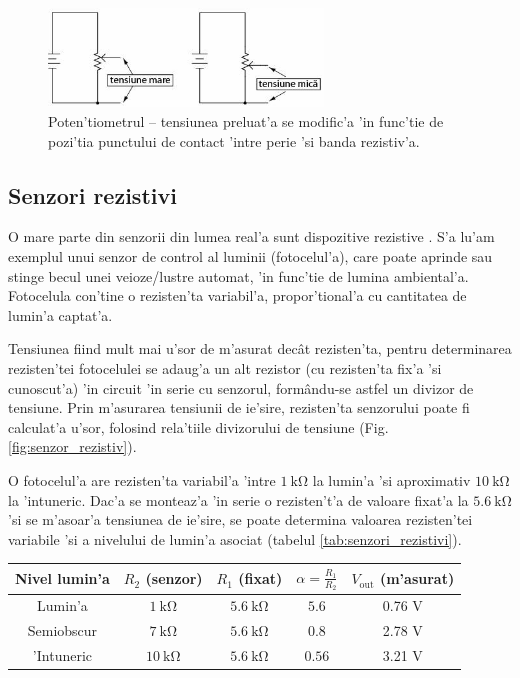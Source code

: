\begin{figure}[!t]
	\centering
		\includegraphics[width=0.65\textwidth]{laborator_01/figuri/6_potentiometru2}
	\caption{Poten'tiometrul -- tensiunea preluat'a se modific'a 'in func'tie de pozi'tia punctului de contact 'intre perie 'si banda rezistiv'a.} %
	\label{fig:potentiometru_tensiuni}
\end{figure}

\subsection*{Senzori rezistivi}

O mare parte din senzorii din lumea real'a sunt dispozitive rezistive \cite{aplicatii_senzori_rezistivi}. S'a lu'am exemplul unui senzor de control al luminii (fotocelul'a), care poate aprinde sau stinge becul unei veioze/lustre automat, 'in func'tie de lumina ambiental'a. Fotocelula con'tine o rezisten'ta variabil'a, propor'tional'a cu cantitatea de lumin'a captat'a.

Tensiunea fiind mult mai u'sor de m'asurat dec\^at rezisten'ta, pentru determinarea rezisten'tei fotocelulei se adaug'a un alt rezistor (cu rezisten'ta fix'a 'si cunoscut'a) 'in circuit 'in serie cu senzorul, form\^andu-se astfel un divizor de tensiune. Prin m'asurarea tensiunii de ie'sire, rezisten'ta senzorului poate fi calculat'a u'sor, folosind rela'tiile divizorului de tensiune (Fig. \ref{fig:senzor_rezistiv}).

\begin{example}
O fotocelul'a are rezisten'ta variabil'a 'intre $1~\mathrm{k\Omega}$ la lumin'a 'si aproximativ $10~\mathrm{k\Omega}$ la 'intuneric. Dac'a se monteaz'a 'in serie o rezisten't'a de valoare fixat'a la $5.6~\mathrm{k\Omega}$ 'si se m'asoar'a tensiunea de ie'sire, se poate determina valoarea rezisten'tei variabile 'si a nivelului de lumin'a asociat (tabelul \ref{tab:senzori_rezistivi}).

  \begin{center}
    \begin{tabular}{ccccc}\label{tab:senzori_rezistivi}
      Nivel lumin'a & $R_2$ (senzor) & $R_1$ (fixat) & $\alpha=\frac{R_1}{R_2}$ & $V_\mathrm{out}$ (m'asurat) \\
      \midrule
      Lumin'a & $1~\mathrm{k\Omega}$ &  $5.6~\mathrm{k\Omega}$ & $5.6$ & 0.76 V \\
      Semiobscur &  $7~\mathrm{k\Omega}$ &  $5.6~\mathrm{k\Omega}$ & $0.8$ & 2.78 V \\
      'Intuneric &  $10~\mathrm{k\Omega}$ &  $5.6~\mathrm{k\Omega}$ & $0.56$ & 3.21 V \\
    \end{tabular}
  \end{center}
\end{example}

